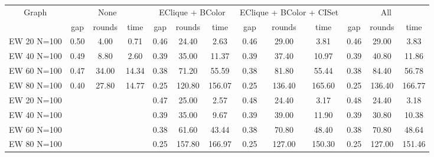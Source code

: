 \documentclass[landscape, 12pt]{report}
\begin{document}
	
	\begin{tabular}{|c|ccc|ccc|ccc|ccc|}
	\hline
	\multicolumn{1}{|c|}{Graph} & \multicolumn{3}{|c|}{None} & \multicolumn{3}{|c|}{EClique + BColor} & \multicolumn{3}{|c|}{EClique + BColor + CISet} & \multicolumn{3}{|c|}{All}
	\\
	 & gap & rounds & time & gap & rounds & time & gap & rounds & time & gap & rounds & time
	\\
	\hline
	EW 20 N=100 & 0.50 & 4.00 & 0.71 & 0.46 & 24.40 & 2.63 & 0.46 & 29.00 & 3.81 & 0.46 & 29.00 & 3.83
	\\
	EW 40 N=100 & 0.49 & 8.80 & 2.60 & 0.39 & 35.00 & 11.37 & 0.39 & 37.40 & 10.97 & 0.39 & 40.80 & 11.86
	\\
	EW 60 N=100 & 0.47 & 34.00 & 14.34 & 0.38 & 71.20 & 55.59 & 0.38 & 81.80 & 55.44 & 0.38 & 84.40 & 56.78
	\\
	EW 80 N=100 & 0.40 & 27.80 & 14.77 & 0.25 & 120.80 & 156.07 & 0.25 & 136.40 & 165.60 & 0.25 & 136.40 & 166.77
	\\
	\hline 
	EW 20 N=100 & & & & 0.47 & 25.00 & 2.57 & 0.48 & 24.40 & 3.17 & 0.48 & 24.40 & 3.18
	\\
	EW 40 N=100 & & & & 0.39 & 35.00 & 9.67 & 0.39 & 39.00 & 11.90 & 0.39 & 30.80 & 10.38
	\\
	EW 60 N=100 & & & & 0.38 & 61.60 & 43.44 & 0.38 & 70.80 & 48.40 & 0.38 & 70.80 & 48.64
	\\
	EW 80 N=100 & & & & 0.25 & 157.80 & 166.97 & 0.25 & 127.00 & 150.30 & 0.25 & 127.00 & 151.46
	\\
	\hline
	 \end{tabular}
	
	\clearpage
	
\end{document}
